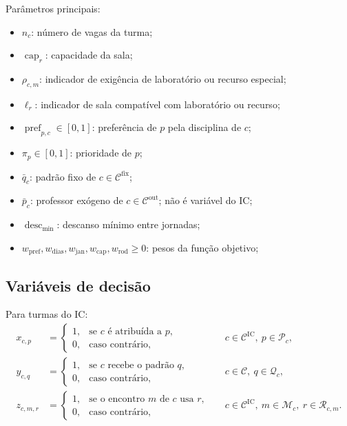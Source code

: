 Parâmetros principais:
\begin{itemize}
    \item $n_c$: número de vagas da turma;
    \item $\operatorname{cap}_r$: capacidade da sala;
    \item $\rho_{c,m}$: indicador de exigência de laboratório ou recurso especial;
    \item $\ell_r$: indicador de sala compatível com laboratório ou recurso;
    \item $\operatorname{pref}_{p,c}\in[0,1]$: preferência de $p$ pela disciplina de $c$;
    \item $\pi_p\in[0,1]$: prioridade de $p$;
    \item $\bar q_c$: padrão fixo de $c\in\mathcal{C}^{\mathrm{fix}}$;
    \item $\bar p_c$: professor exógeno de $c\in\mathcal{C}^{\mathrm{out}}$; não é variável do IC;
    \item $\operatorname{desc}_{\min}$: descanso mínimo entre jornadas;
    \item $w_{\mathrm{pref}},w_{\mathrm{dias}},w_{\mathrm{jan}},w_{\mathrm{cap}},w_{\mathrm{rod}}\geq0$: pesos da função objetivo; 
\end{itemize}

\subsection{Variáveis de decisão}
\label{subsec:variaveis}

Para turmas do IC:
\begin{align}
    x_{c,p} &= \begin{cases}1,&\text{se }c\text{ é atribuída a }p,\\0,&\text{caso contrário,}\end{cases}
    &&c\in\mathcal{C}^{\mathrm{IC}},\ p\in\mathcal{P}_c,\\
    y_{c,q} &= \begin{cases}1,&\text{se }c\text{ recebe o padrão }q,\\0,&\text{caso contrário,}\end{cases}
    &&c\in\mathcal{C},\ q\in\mathcal{Q}_c,\\
    z_{c,m,r} &= \begin{cases}1,&\text{se o encontro }m\text{ de }c\text{ usa }r,\\0,&\text{caso contrário,}\end{cases}
    &&c\in\mathcal{C}^{\mathrm{IC}},\ m\in\mathcal{M}_c,\ r\in\mathcal{R}_{c,m}.
\end{align}


